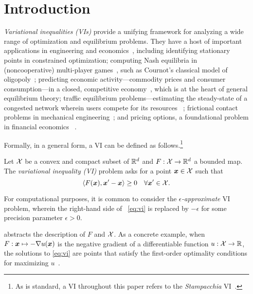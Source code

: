 \section{Introduction}

\emph{Variational inequalities (VIs)} provide a unifying framework for analyzing a wide range of optimization and equilibrium problems. They have a host of important applications in engineering and economics~\citep{Facchinei03:Finite}, including identifying stationary points in constrained optimization; computing Nash equilibria in (noncooperative) multi-player games~\citep{Nash51:Non}, such as Cournot's classical model of oligopoly~\citep{Cournot38:Recherches}; predicting economic activity---commodity prices and consumer consumption---in a closed, competitive economy~\citep{Arrow54:Existence}, which is at the heart of general equilibrium theory; traffic equilibrium problems---estimating the steady-state of a congested network wherein users compete for its resources
~\citep{Dafermos80:Traffic}; frictional contact problems in mechanical engineering~\citep{Capatina14:Variational}; and pricing options, a foundational problem in financial economics
~\citep{Black73:Pricing}.

Formally, in a general form, a VI can be defined as follows.\footnote{As is standard, a VI throughout this paper refers to the \emph{Stampacchia} VI~\citep{Kinderlehrer00:Introduction}.}

\begin{definition}\label{def:vi}
    Let ${\mathcal{X}}$ be a convex and compact subset of $\mathbb R^d$ and $F: {\mathcal{X}} \to \mathbb R^d$ a bounded map. The {\em variational inequality (VI)} problem asks for a point ${\bm{x}} \in {\mathcal{X}}$ such that
    \begin{equation}\label{eq:vi}
        \ip{F(\vx), \vx' - \vx} \ge 0 \quad \forall \vx' \in \cX.
    \end{equation}
    \end{definition}
For computational purposes, it is common to consider the \emph{$\epsilon$-approximate} VI problem, wherein the right-hand side of ~\eqref{eq:vi} is replaced by $-\epsilon$ for some precision parameter $\epsilon > 0$.

 abstracts the description of $F$ and ${\mathcal{X}}$. As a concrete example, when $F : {\bm{x}} \mapsto -\nabla u ({\bm{x}})$ is the negative gradient of a differentiable function $u : {\mathcal{X}} \to \mathbb R$, the solutions to \eqref{eq:vi} are points that satisfy the first-order optimality conditions for maximizing $u$~\citep{Boyd04:Convex}. %

